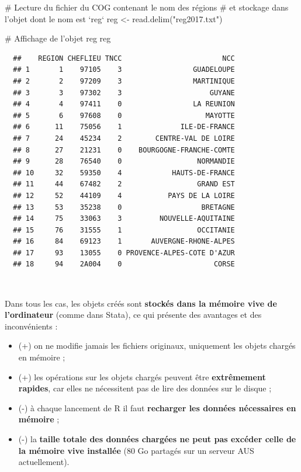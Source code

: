 \documentclass[12pt,twosided, notitlepage]{book}
\newenvironment{Shaded}{}{}
\newcommand{\CommentTok}[1]{\textcolor[rgb]{0.00,0.50,0.00}{#1}}
\newcommand{\KeywordTok}[1]{\textcolor[rgb]{0.00,0.00,1.00}{#1}}
\newcommand{\NormalTok}[1]{#1}
\newcommand{\StringTok}[1]{\textcolor[rgb]{0.00,0.50,0.50}{#1}}
\providecommand{\tightlist}{%
  \setlength{\itemsep}{0pt}\setlength{\parskip}{0pt}}
\renewenvironment{Shaded}{\begin{snugshade}}{\end{snugshade}}
\begin{document}

\begin{Shaded}
\begin{Highlighting}[]
\CommentTok{# Lecture du fichier du COG contenant le nom des régions}
\CommentTok{# et stockage dans l'objet dont le nom est `reg`}
\NormalTok{reg <-}\StringTok{ }\KeywordTok{read.delim}\NormalTok{(}\StringTok{"reg2017.txt"}\NormalTok{)}
\end{Highlighting}
\end{Shaded}

\begin{Shaded}
\begin{Highlighting}[]
\CommentTok{# Affichage de l'objet reg}
\NormalTok{reg}
\end{Highlighting}
\end{Shaded}

\begin{verbatim}
  ##    REGION CHEFLIEU TNCC                        NCC
  ## 1       1    97105    3                 GUADELOUPE
  ## 2       2    97209    3                 MARTINIQUE
  ## 3       3    97302    3                     GUYANE
  ## 4       4    97411    0                 LA REUNION
  ## 5       6    97608    0                    MAYOTTE
  ## 6      11    75056    1              ILE-DE-FRANCE
  ## 7      24    45234    2        CENTRE-VAL DE LOIRE
  ## 8      27    21231    0    BOURGOGNE-FRANCHE-COMTE
  ## 9      28    76540    0                  NORMANDIE
  ## 10     32    59350    4            HAUTS-DE-FRANCE
  ## 11     44    67482    2                  GRAND EST
  ## 12     52    44109    4           PAYS DE LA LOIRE
  ## 13     53    35238    0                   BRETAGNE
  ## 14     75    33063    3         NOUVELLE-AQUITAINE
  ## 15     76    31555    1                  OCCITANIE
  ## 16     84    69123    1       AUVERGNE-RHONE-ALPES
  ## 17     93    13055    0 PROVENCE-ALPES-COTE D'AZUR
  ## 18     94    2A004    0                      CORSE
\end{verbatim}

~

Dans tous les cas, les objets créés sont \textbf{stockés dans la mémoire
vive de l'ordinateur} (comme dans Stata), ce qui présente des avantages
et des inconvénients :

\begin{itemize}
\tightlist
\item
  (+) on ne modifie jamais les fichiers originaux, uniquement les objets
  chargés en mémoire ;
\item
  (+) les opérations sur les objets chargés peuvent être
  \textbf{extrêmement rapides}, car elles ne nécessitent pas de lire des
  données sur le disque ;
\item
  (-) à chaque lancement de R il faut \textbf{recharger les données
  nécessaires en mémoire} ;
\item
  (-) la \textbf{taille totale des données chargées ne peut pas excéder
  celle de la mémoire vive installée} (80 Go partagés sur un serveur AUS
  actuellement).
\end{itemize}
\end{document}
